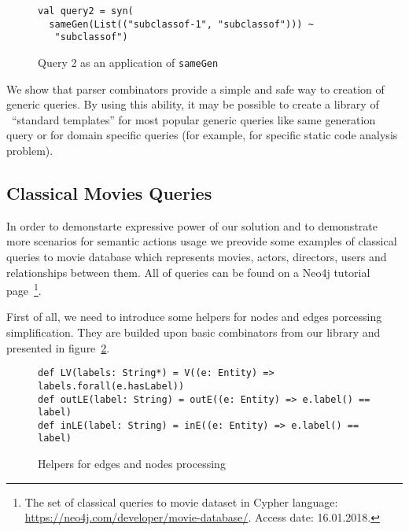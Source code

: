 \begin{figure}[h]
\begin{lstlisting}
val query2 = syn(
  sameGen(List(("subclassof-1", "subclassof"))) ~
   "subclassof")
\end{lstlisting}
\caption{Query 2 as an application of \lstinline{sameGen}}
\label{fig:query2Gen}
\end{figure}


We show that parser combinators provide a simple and safe way to creation of generic queries.
By using this ability, it may be possible to create a library of \ ``standard templates'' for most popular generic queries like same generation query or for domain specific queries (for example, for specific static code analysis problem).


\subsection{Classical Movies Queries}

In order to demonstarte expressive power of our solution and to demonstrate more scenarios for
semantic actions usage we preovide some examples of classical queries to movie database which
represents movies, actors, directors, users and relationships between them.
All of queries can be found on a Neo4j tutorial page~\footnote{The set of classical queries to movie dataset in Cypher language: \url{https://neo4j.com/developer/movie-database/}. Access date: 16.01.2018.}.

First of all, we need to introduce some helpers for nodes and edges porcessing simplification.
They are builded upon basic combinators from our library and presented in figure~\ref{fig:helpers}.

\begin{figure}[h]
\begin{lstlisting}
def LV(labels: String*) = V((e: Entity) => labels.forall(e.hasLabel))
def outLE(label: String) = outE((e: Entity) => e.label() == label)
def inLE(label: String) = inE((e: Entity) => e.label() == label)
\end{lstlisting}
\caption{Helpers for edges and nodes processing}
\label{fig:helpers}
\end{figure}

